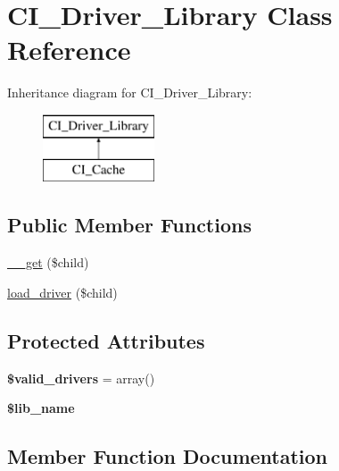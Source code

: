 \hypertarget{class_c_i___driver___library}{}\section{C\+I\+\_\+\+Driver\+\_\+\+Library Class Reference}
\label{class_c_i___driver___library}
Inheritance diagram for C\+I\+\_\+\+Driver\+\_\+\+Library\+:\begin{figure}[H]
\begin{center}
\leavevmode
\includegraphics[height=2.000000cm]{class_c_i___driver___library}
\end{center}
\end{figure}
\subsection*{Public Member Functions}
\begin{DoxyCompactItemize}
\item 
\mbox{\hyperlink{class_c_i___driver___library_afcdd60f0ddae167ee77b6eeb6f8c5dac}{\+\_\+\+\_\+get}} (\$child)
\item 
\mbox{\hyperlink{class_c_i___driver___library_a99e23bfb3eae32c0f4b30243499fa655}{load\+\_\+driver}} (\$child)
\end{DoxyCompactItemize}
\subsection*{Protected Attributes}
\begin{DoxyCompactItemize}
\item 
\mbox{\label{class_c_i___driver___library_ac053fb8ca5474af123d74a1951daaadf}} 
{\bfseries \$valid\+\_\+drivers} = array()
\item 
\mbox{\label{class_c_i___driver___library_aefe53d5723ca9e6e2e3303ab91cc18d8}} 
{\bfseries \$lib\+\_\+name}
\end{DoxyCompactItemize}


\subsection{Member Function Documentation}
\mbox{\label{class_c_i___driver___library_afcdd60f0ddae167ee77b6eeb6f8c5dac}} 
